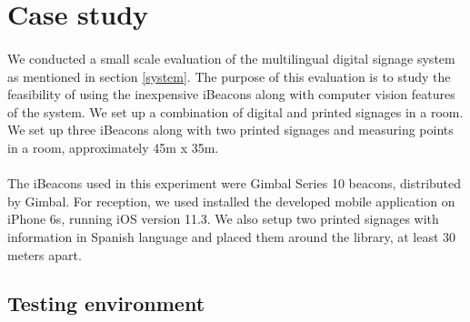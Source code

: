 \documentclass[12pt]{article}
\begin{document}
\section{Case study}
\label{evaluation}

%


\paragraph{}We conducted a small scale evaluation of the multilingual digital signage system as mentioned in section \ref{system}. The purpose of this evaluation is to study the feasibility of using the inexpensive iBeacons along with computer vision features of the system. We set up a combination of digital and printed signages in a room. We set up three iBeacons along with two printed signages and measuring points in a room, approximately 45m x 35m.

\paragraph{}The iBeacons used in this experiment were Gimbal Series 10 beacons, distributed by Gimbal. For reception, we used installed the developed mobile application on iPhone 6s, running iOS version 11.3. We also setup two printed signages with information in Spanish language and placed them around the library, at least 30 meters apart.

\subsection{Testing environment}
\end{document}
